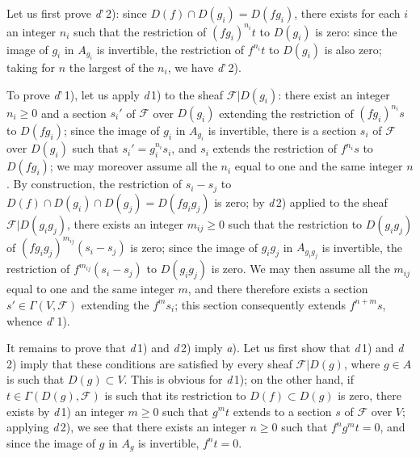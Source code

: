 Let us first prove \textit{d}'\,2): since
$D(f)\cap D(g_i)=D(fg_i)$, there exists for each $i$ an integer $n_i$ such
that the restriction of $(fg_i)^{n_i}t$ to $D(g_i)$ is zero: since
the image of $g_i$ in $A_{g_i}$ is invertible, the restriction of
$f^{n_i}t$ to $D(g_i)$ is also zero; taking for $n$ the largest of the
$n_i$, we have \textit{d}'\,2).

To prove \textit{d}'\,1), let us apply \textit{d}\,1) to the sheaf
$\mathscr{F}|D(g_i)$: there exist an integer $n_i\geq0$ and a section $s_i'$
of $\mathscr{F}$ over $D(g_i)$ extending the restriction of
$(fg_i)^{n_i}s$ to $D(fg_i)$; since the image of $g_i$ in $A_{g_i}$ is
invertible, there is a section $s_i$ of $\mathscr{F}$ over $D(g_i)$ such
that $s_i'=g_i^{n_i}s_i$, and $s_i$ extends the restriction of $f^{n_i}s$ to
$D(fg_i)$; we may moreover assume all the $n_i$ equal to one and the same
integer $n$. By construction, the restriction of $s_i-s_j$ to
$D(f)\cap D(g_i)\cap D(g_j)=D(fg_i g_j)$ is zero; by
\textit{d}\,2) applied to the sheaf $\mathscr{F}|D(g_i g_j)$, there exists an
integer $m_{ij}\geq0$ such that the restriction to $D(g_i g_j)$ of
$(fg_i g_j)^{m_{ij}}(s_i-s_j)$ is zero; since the image of $g_i g_j$
in $A_{g_i g_j}$ is invertible, the restriction of
$f^{m_{ij}}(s_i-s_j)$ to $D(g_i g_j)$ is zero. We may then assume all
the $m_{ij}$ equal to one and the same integer $m$, and there therefore
exists a section $s'\in\Gamma(V,\mathscr{F})$ extending the $f^m s_i$; this
section consequently extends $f^{n+m}s$, whence \textit{d}'\,1).

It remains to prove that \textit{d}\,1) and \textit{d}\,2) imply
\textit{a}). Let us first show that \textit{d}\,1) and \textit{d}\,2)
imply that these conditions are satisfied by every sheaf
$\mathscr{F}|D(g)$, where $g\in A$ is such that $D(g)\subset V$. This is
obvious for \textit{d}\,1); on the other hand, if $t\in\Gamma(D(g),\mathscr{F})$
is such that its restriction to $D(f)\subset D(g)$ is zero, there exists by
\textit{d}\,1) an integer $m\geq0$ such that $g^m t$
extends to a section $s$ of $\mathscr{F}$ over $V$; applying
\textit{d}\,2), we see that there exists an integer $n\geq0$ such that
$f^n g^m t=0$, and since the image of $g$ in $A_g$ is invertible, $f^n t=0$.

